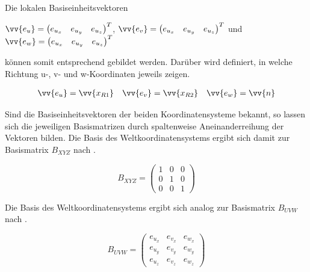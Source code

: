 Die lokalen Basiseinheitsvektoren \begin{singlespace} $\vv{e_{u}}=\begin{pmatrix}
	e_{u_x} & e_{u_y} & e_{u_z}
	\end{pmatrix}^T $, 
	$\vv{e_{v}}=\begin{pmatrix}
	e_{u_x} & e_{u_y} & e_{u_z}
	\end{pmatrix}^T$ und 
	$\vv{e_{w}}=\begin{pmatrix}
	e_{u_x} & e_{u_y} & e_{u_z}
	\end{pmatrix}^T$ 
\end{singlespace} können somit entsprechend   gebildet werden. Darüber wird definiert, in welche Richtung u-, v- und w-Koordinaten jeweils zeigen. 

\begin{equation}\label{eq:basevectorsuvw}
	\begin{aligned}
	\vv{e_{u}}=\vv{x_{R1}} 
	&& 
	\vv{e_{v}}=\vv{x_{R2}}  
	&& 
	\vv{e_{w}}=\vv{n} 
	\end{aligned}
\end{equation}

Sind die Basiseinheitsvektoren der beiden Koordinatensysteme bekannt, so lassen sich die jeweiligen Basismatrizen  durch spaltenweise Aneinanderreihung der Vektoren bilden. Die Basis des Weltkoordinatensystems ergibt sich damit zur Basismatrix $B_{XYZ}$ nach . 

\begin{singlespace}
	\begin{equation}\label{eq:basematrixxyz}
		B_{XYZ} = \begin{pmatrix}
		1 & 0 & 0 \\ 
		0 & 1 & 0 \\ 
		0 & 0 & 1
		\end{pmatrix} 
	\end{equation} 
\end{singlespace}

Die Basis des Weltkoordinatensystems ergibt sich analog zur Basismatrix $B_{UVW}$ nach .

\begin{singlespace}
	\begin{equation}\label{eq:basematrixuvw}
	B_{UVW} = \begin{pmatrix}
	e_{u_x} & e_{v_x} & e_{w_x} \\ 
	e_{u_y} & e_{v_y} & e_{w_y} \\ 
	e_{u_z} & e_{v_z} & e_{w_z}
	\end{pmatrix} 
	\end{equation} 
\end{singlespace}

